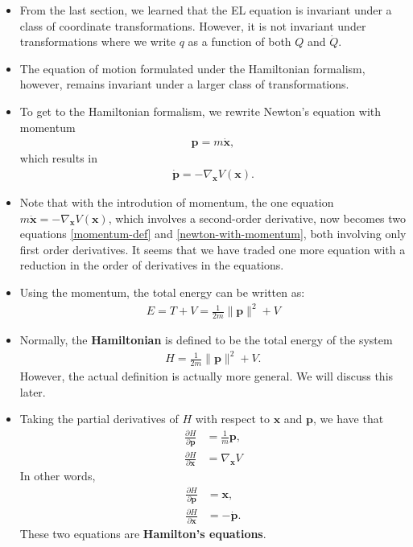 \documentclass[10pt]{article}
\newcommand{\ve}[1]{\mathbf{#1}}
\begin{document}
  \begin{itemize}
  	\item From the last section, we learned that the EL equation is invariant under a class of coordinate transformations. However, it is not invariant under transformations where we write $q$ as a function of both $Q$ and $\dot{Q}$.

  	\item The equation of motion formulated under the Hamiltonian formalism, however, remains invariant under a larger class of transformations.

  	\item To get to the Hamiltonian formalism, we rewrite Newton's equation with momentum
  	\begin{align} \label{momentum-def}
  		\ve{p} = m \dot{\ve{x}},
  	\end{align}
  	which results in
  	\begin{align} \label{newton-with-momentum}
  		\dot{\ve{p}} = -\nabla_{\ve{x}}V(\ve{x}).
  	\end{align}

  	\item Note that with the introdution of momentum, the one equation $m\ddot{\ve{x}} = -\nabla_{\ve{x}}V(\ve{x})$, which involves a second-order derivative, now becomes two equations \eqref{momentum-def} and \eqref{newton-with-momentum}, both involving only first order derivatives. It seems that we have traded one more equation with a reduction in the order of derivatives in the equations.

  	\item Using the momentum, the total energy can be written as:
  	\begin{align*}
  		E = T + V = \frac{1}{2m}  \| \ve{p} \|^2 + V
  	\end{align*}

  	\item Normally, the {\bf Hamiltonian} is defined to be the total energy of the system
  	\begin{align*}
  		H = \frac{1}{2m}  \| \ve{p} \|^2 + V.
  	\end{align*}
  	However, the actual definition is actually more general. We will discuss this later.

  	\item Taking the partial derivatives of $H$ with respect to $\ve{x}$ and $\ve{p}$, we have that
  	\begin{align*}
  		\frac{\partial H}{\partial \ve{p}} &= \frac{1}{m}\ve{p}, \\
  		\frac{\partial H}{\partial \ve{x}} &= \nabla_{\ve{x}} V
  	\end{align*}
  	In other words,
  	\begin{align*}
  		\frac{\partial H}{\partial \ve{p}} &= \ve{x}, \\
  		\frac{\partial H}{\partial \ve{x}} &= -\dot{\ve{p}}.
  	\end{align*}
  	These two equations are {\bf Hamilton's equations}.


\end{itemize}
\end{document}
